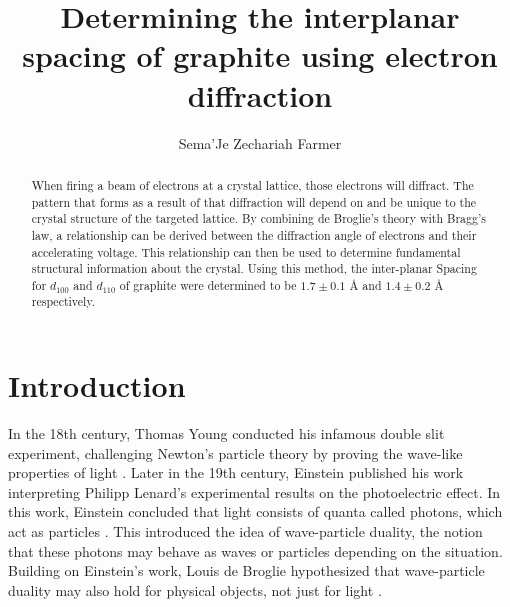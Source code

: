 \documentclass[rc,ec]{physicsinprogress}
\begin{document}
\title{Determining the interplanar spacing of graphite using electron diffraction}%


\author{Sema'Je Zechariah Farmer}
%



\begin{abstract}

When firing a beam of electrons at a crystal lattice, those electrons will diffract. The pattern that forms as a result of that diffraction will depend on and be unique to the crystal structure of the targeted lattice. By combining de Broglie's theory with Bragg's law, a relationship can be derived between the diffraction angle of electrons and their accelerating voltage. This relationship can then be used to determine fundamental structural information about the crystal. Using this method, the inter-planar Spacing for $d_{100}$ and $d_{110}$ of graphite were determined to be  $1.7 \pm 0.1 \text{ Å}$ and $1.4\pm 0.2 \text{ Å}$ respectively.

\end{abstract}

\maketitle


\section{\label{sec:level1} Introduction}
In the 18th century, Thomas Young conducted his infamous double slit experiment, challenging Newton's particle theory by proving the wave-like properties of light \cite{Young1802}. Later in the 19th century, Einstein published his work interpreting Philipp Lenard's experimental results on the photoelectric effect. In this work, Einstein concluded that light consists of quanta called photons, which act as particles \cite{Arons1965}. This introduced the idea of wave-particle duality, the notion that these photons may behave as waves or particles depending on the situation. Building on Einstein's work, Louis de Broglie hypothesized that wave-particle duality may also hold for physical objects, not just for light \cite{Broglie1924}.
\end{document}
